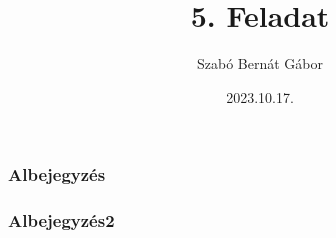 \documentclass{book}
\begin{document}
\title{5. Feladat}
\author{Szabó Bernát Gábor}
\date{2023.10.17.}
\frontmatter
\maketitle
\tableofcontents
\mainmatter
\chapter{}
\subsection{Albejegyzés}
\subsection{Albejegyzés2}
\cite{bib}
\cite{bib}
\hulipsum[1]
\chapter{}
\hulipsum[1]
\chapter{}
\cite{bib}
\cite{bib}
\hulipsum[1]
\backmatter


\cleardoublepage
\printindex
\end{document}
